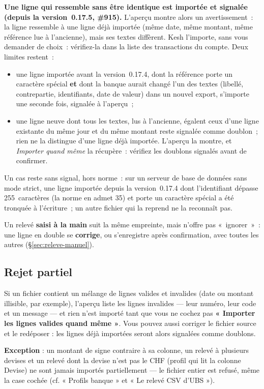 \documentclass[a4paper,11pt,oneside]{article}
\begin{document}
\textbf{Une ligne qui ressemble sans être identique est importée et signalée (depuis la version~0.17.5, \#915).} L'aperçu montre alors un avertissement~: la ligne ressemble à une ligne déjà importée (même date, même montant, même référence lue à l'ancienne), mais ses textes diffèrent. Kesh l'importe, sans vous demander de choix~: vérifiez-la dans la liste des transactions du compte. Deux limites restent~:
\begin{itemize}
    \item une ligne importée avant la version~0.17.4, dont la référence porte un caractère spécial \textbf{et} dont la banque aurait changé l'un des textes (libellé, contrepartie, identifiants, date de valeur) dans un nouvel export, s'importe une seconde fois, signalée à l'aperçu~;
    \item une ligne neuve dont tous les textes, lus à l'ancienne, égalent ceux d'une ligne existante du même jour et du même montant reste signalée comme doublon~; rien ne la distingue d'une ligne déjà importée. L'aperçu la montre, et \emph{Importer quand même} la récupère~: vérifiez les doublons signalés avant de confirmer.
\end{itemize}

Un cas reste sans signal, hors norme~: sur un serveur de base de données sans mode strict, une ligne importée depuis la version~0.17.4 dont l'identifiant dépasse 255~caractères (la norme en admet 35) et porte un caractère spécial a été tronquée à l'écriture~; un autre fichier qui la reprend ne la reconnaît pas.

Un relevé \textbf{saisi à la main} suit la même empreinte, mais n'offre pas «~ignorer~»~: une ligne en double se \textbf{corrige}, ou s'enregistre après confirmation, avec toutes les autres (\S\ref{sec:releve-manuel}).

\subsection{Rejet partiel}

Si un fichier contient un mélange de lignes valides et invalides (date ou montant illisible, par exemple), l'aperçu liste les lignes invalides — leur numéro, leur code et un message — et rien n'est importé tant que vous ne cochez pas \textbf{« Importer les lignes valides quand même »}. Vous pouvez aussi corriger le fichier source et le redéposer : les lignes déjà importées seront alors signalées comme doublons.

\textbf{Exception} : un montant de signe contraire à sa colonne, un relevé à plusieurs devises et un relevé dont la devise n'est pas le CHF (profil qui lit la colonne Devise) ne sont jamais importés partiellement — le fichier entier est refusé, même la case cochée (cf. « Profils banque » et « Le relevé CSV d'UBS »).
\end{document}
